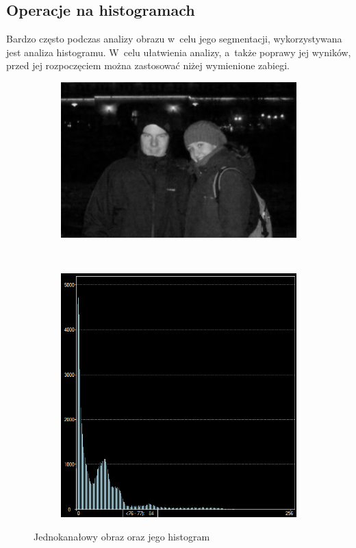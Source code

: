 \subsection{Operacje na histogramach}
Bardzo często podczas analizy obrazu w~celu jego segmentacji, wykorzystywana jest analiza histogramu. W~celu ułatwienia analizy, a~także poprawy jej wyników, przed jej rozpoczęciem można zastosować niżej wymienione zabiegi.
\begin{figure}
  \centering
  \begin{subfigure}[b]{0.45\textwidth}
    \includegraphics[width=\textwidth]{img/image-histogram}
    \label{fig:image_histogram}
  \end{subfigure}
  ~
  \begin{subfigure}[b]{0.45\textwidth}
    \includegraphics[width=\textwidth]{img/image-histogram-histogram}
    \label{fig:image_histogram_histogram}
  \end{subfigure}
  \caption{Jednokanałowy obraz oraz jego histogram}
  \label{fig:image_histogram_g}
\end{figure}
